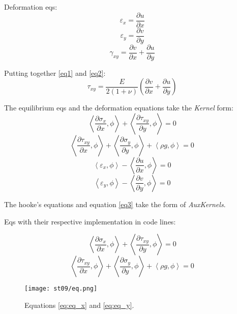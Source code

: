 \documentclass[11pt,letterpaper]{article}
\begin{document}
Deformation eqs:
\begin{equation}
\varepsilon_x = \frac{\partial u}{\partial x}
\end{equation}
\begin{equation}
\varepsilon_y = \frac{\partial v}{\partial y}
\end{equation}
\begin{equation}
\gamma_{xy} = \frac{\partial v}{\partial x} + \frac{\partial u}{\partial y}
\label{eq2}
\end{equation}

Putting together \ref{eq1} and \ref{eq2}:
\begin{equation}
\tau_{xy} = \frac{E}{2(1+\nu)} (\frac{\partial v}{\partial x} + \frac{\partial u}{\partial y})
\label{eq3}
\end{equation}

The equilibrium eqs and the deformation equations take the \textit{Kernel} form:
\begin{equation}
\left< \frac{\partial \sigma_x}{\partial x}, \phi \right> + \left< \frac{\partial \tau_{xy}}{\partial y}, \phi \right> = 0
\end{equation}
\begin{equation}
\left< \frac{\partial \tau_{xy}}{\partial x}, \phi \right> + \left< \frac{\partial \sigma_{y}}{\partial y}, \phi \right> + \left< \rho g , \phi \right>= 0
\end{equation}
\begin{equation}
\left< \varepsilon_x, \phi \right> - \left< \frac{\partial u}{\partial x}, \phi \right> = 0
\end{equation}
\begin{equation}
\left< \varepsilon_y, \phi \right> - \left< \frac{\partial v}{\partial y}, \phi \right> = 0
\end{equation}

The hooke's equations and equation \ref{eq3} take the form of \textit{AuxKernels}.

Eqs with their respective implementation in code lines:

\begin{equation}
\left< \frac{\partial \sigma_x}{\partial x}, \phi \right> + \left< \frac{\partial \tau_{xy}}{\partial y}, \phi \right> = 0
\label{eq:eq_x}
\end{equation}
\begin{equation}
\left< \frac{\partial \tau_{xy}}{\partial x}, \phi \right> + \left< \frac{\partial \sigma_{y}}{\partial y}, \phi \right> + \left< \rho g , \phi \right>= 0
\label{eq:eq_y}
\end{equation}
\begin{figure}[H]
	\centering
	\texttt{[image: st09/eq.png]}
	\hfill
	\caption{Equations \ref{eq:eq_x} and \ref{eq:eq_y}.}
	\label{fig:eq_xy}
\end{figure}
\end{document}
